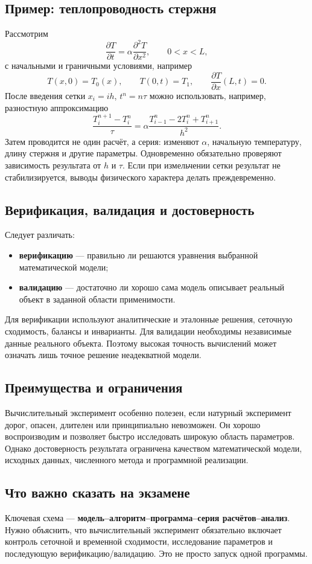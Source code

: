 \subsection{Пример: теплопроводность стержня}

Рассмотрим
\[
\frac{\partial T}{\partial t}
=\alpha\frac{\partial^2T}{\partial x^2},
\qquad 0<x<L,
\]
с начальными и граничными условиями, например
\[
T(x,0)=T_0(x),\qquad
T(0,t)=T_1,
\qquad
\frac{\partial T}{\partial x}(L,t)=0.
\]
После введения сетки $x_i=ih$, $t^n=n\tau$ можно использовать, например,
разностную аппроксимацию
\[
\frac{T_i^{n+1}-T_i^n}{\tau}
=\alpha\frac{T_{i-1}^n-2T_i^n+T_{i+1}^n}{h^2}.
\]
Затем проводится не один расчёт, а серия: изменяют $\alpha$, начальную
температуру, длину стержня и другие параметры. Одновременно обязательно
проверяют зависимость результата от $h$ и $\tau$. Если при измельчении
сетки результат не стабилизируется, выводы физического характера делать
преждевременно.

\subsection{Верификация, валидация и достоверность}

Следует различать:
\begin{itemize}
    \item \textbf{верификацию} --- правильно ли решаются уравнения выбранной
    математической модели;
    \item \textbf{валидацию} --- достаточно ли хорошо сама модель описывает
    реальный объект в заданной области применимости.
\end{itemize}

Для верификации используют аналитические и эталонные решения, сеточную
сходимость, балансы и инварианты. Для валидации необходимы независимые
данные реального объекта. Поэтому высокая точность вычислений может
означать лишь точное решение неадекватной модели.

\subsection{Преимущества и ограничения}

Вычислительный эксперимент особенно полезен, если натурный эксперимент
дорог, опасен, длителен или принципиально невозможен. Он хорошо
воспроизводим и позволяет быстро исследовать широкую область параметров.
Однако достоверность результата ограничена качеством математической
модели, исходных данных, численного метода и программной реализации.

\subsection{Что важно сказать на экзамене}

Ключевая схема --- \textbf{модель--алгоритм--программа--серия расчётов--анализ}.
Нужно объяснить, что вычислительный эксперимент обязательно включает
контроль сеточной и временной сходимости, исследование параметров и
последующую верификацию/валидацию. Это не просто запуск одной программы.

\newpage
